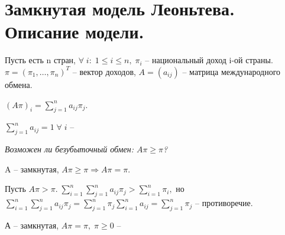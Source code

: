 \chapter{Замкнутая модель Леоньтева. Описание модели.}\label{cha:6}

Пусть есть n стран, $\forall \; i: \; 1 \leq i \leq n, \; \pi_i$ -- национальный доход i-ой страны. $\pi = (\pi_1, \ldots, \pi_n)^T$ -- вектор доходов, $A = (a_{ij})$ -- матрица международного обмена.
\begin{definition}
	$(A\pi)_i = \sum\limits_{j = 1}^na_{ij}\pi_j$.
\end{definition}

\begin{definition}
	$\sum\limits_{j = 1}^na_{ij} = 1 \; \forall \; i$ -- 
\end{definition}

\begin{question}
	\textit{Возможен ли безубыточный обмен: $A\pi \geq \pi$?}
\end{question}

\begin{clair}
	A -- замкнутая, $A\pi \geq \pi \Rightarrow A\pi = \pi.$
\end{clair}

\begin{Proof}
	Пусть $A\pi > \pi. \; \sum\limits_{i = 1}^n\sum\limits_{j = 1}^n a_{ij}\pi_j > \sum\limits_{i = 1}^n\pi_i,$ но $\sum\limits_{i = 1}^n\sum\limits_{j = 1}^n a_{ij}\pi_j = \sum\limits_{j = 1}^n \pi_j \sum\limits_{i = 1}^n a_{ij} = \sum\limits_{j = 1}^n \pi_j$ -- противоречие.
\end{Proof}

\begin{definition}
	А -- замкнутая, $A\pi = \pi, \; \pi \geq 0$ -- 
\end{definition}
